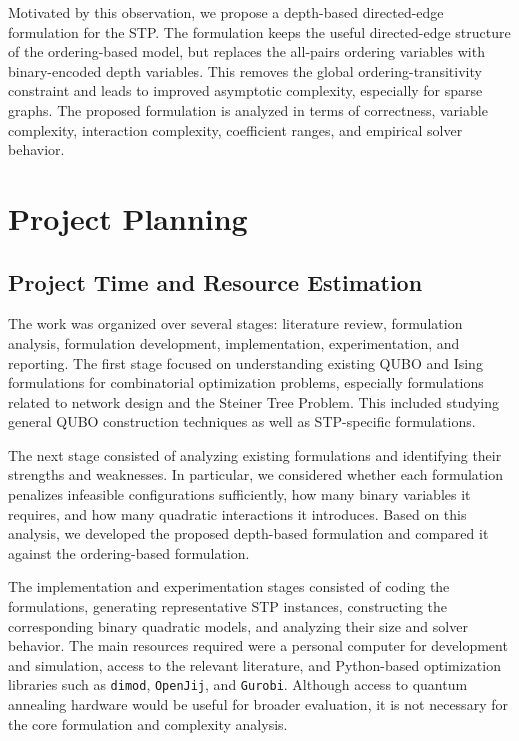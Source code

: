 \documentclass[a4paper,12pt]{report}
\begin{document}
Motivated by this observation, we propose a depth-based directed-edge formulation for the STP. The formulation keeps the useful directed-edge structure of the ordering-based model, but replaces the all-pairs ordering variables with binary-encoded depth variables. This removes the global ordering-transitivity constraint and leads to improved asymptotic complexity, especially for sparse graphs. The proposed formulation is analyzed in terms of correctness, variable complexity, interaction complexity, coefficient ranges, and empirical solver behavior.

\section{Project Planning}

\subsection{Project Time and Resource Estimation}

The work was organized over several stages: literature review, formulation analysis, formulation development, implementation, experimentation, and reporting. The first stage focused on understanding existing QUBO and Ising formulations for combinatorial optimization problems, especially formulations related to network design and the Steiner Tree Problem. This included studying general QUBO construction techniques as well as STP-specific formulations.

The next stage consisted of analyzing existing formulations and identifying their strengths and weaknesses. In particular, we considered whether each formulation penalizes infeasible configurations sufficiently, how many binary variables it requires, and how many quadratic interactions it introduces. Based on this analysis, we developed the proposed depth-based formulation and compared it against the ordering-based formulation.

The implementation and experimentation stages consisted of coding the formulations, generating representative STP instances, constructing the corresponding binary quadratic models, and analyzing their size and solver behavior. The main resources required were a personal computer for development and simulation, access to the relevant literature, and Python-based optimization libraries such as \texttt{dimod}, \texttt{OpenJij}, and \texttt{Gurobi}. Although access to quantum annealing hardware would be useful for broader evaluation, it is not necessary for the core formulation and complexity analysis.
\end{document}
